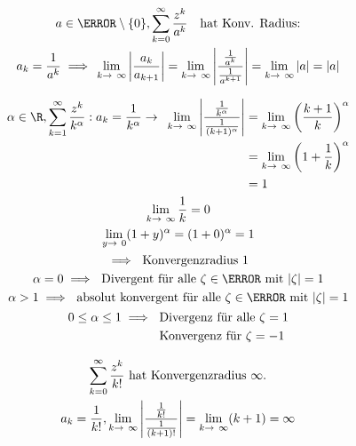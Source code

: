 \begin{bsp*}
	\begin{gather*}
		a \in \C \setminus \{ 0 \} , \sum_{k=0}^\infty \frac{z^k}{a^k} \quad \text{hat Konv. Radius:} \\
		a_k = \frac{1}{a^k} \implies \lim_{k \rightarrow \infty} \abs{\frac{a_k}{a_{k+1}}} = \lim_{k \rightarrow \infty} \abs{\frac{\frac{1}{a^k}}{\frac{1}{a^{k+1}}}} = \lim_{k \rightarrow \infty} \abs{a} = \abs{a}
	\end{gather*}
\end{bsp*}
\begin{bsp*}
	\begin{gather*}
		\begin{split}
			\alpha \in \R , \sum_{k=1}^\infty \frac{z^k}{k^\alpha} : a_k = \frac{1}{k^\alpha} \rightarrow \lim_{k \rightarrow \infty} \abs{\frac{\frac{1}{k^\alpha}}{\frac{1}{(k+1)^\alpha}}}
				&= \lim_{k \rightarrow \infty} \left( \frac{k+1}{k} \right)^\alpha\\
				&= \lim_{k \rightarrow \infty} \left(1 + \frac{1}{k} \right)^\alpha\\
				&= 1 \\
		\end{split} \\
		\lim_{k \rightarrow \infty} \frac{1}{k} = 0 \\
		\lim_{y \rightarrow 0} (1+y)^\alpha = (1+0)^\alpha = 1 \\
		\implies \text{ Konvergenzradius } 1 \\
		\alpha = 0 \implies \text{ Divergent für alle } \zeta \in \C \text{ mit } \abs{\zeta} = 1 \\
		\alpha > 1 \implies \text{ absolut konvergent für alle } \zeta \in \C \text{ mit } \abs{\zeta} = 1 \\
		\begin{split}
			0 \leq \alpha \leq 1 \implies	&\text{ Divergenz für alle } \zeta = 1	\\
									&\text{ Konvergenz für } \zeta = -1	
		\end{split}
	\end{gather*}
\end{bsp*}
\begin{bsp*}
	\begin{gather*}
		\sum_{k=0}^\infty \frac{z^k}{k!} \text{ hat Konvergenzradius } \infty . \\
		a_k = \frac{1}{k!} , \lim_{k \rightarrow \infty} \abs{\frac{\frac{1}{k!}}{\frac{1}{(k+1)!}}} = \lim_{k \rightarrow \infty} (k+1) = \infty
	\end{gather*}
\end{bsp*}
